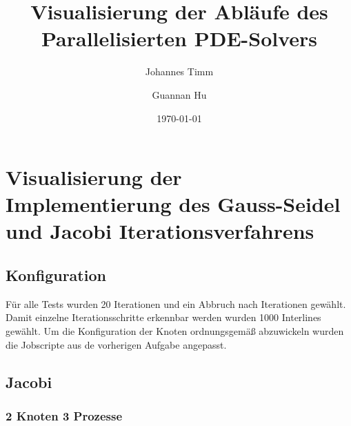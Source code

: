 \documentclass[a4paper,12pt]{scrartcl}
\title{Visualisierung der Abläufe des Parallelisierten PDE-Solvers}
\author{Johannes Timm \and Guannan Hu}
\date{\today}
\begin{document}
\maketitle
\notag

\section{Visualisierung der Implementierung des Gauss-Seidel und Jacobi Iterationsverfahrens}
\subsection{Konfiguration}
Für alle Tests wurden 20 Iterationen und ein Abbruch nach Iterationen gewählt. Damit einzelne Iterationsschritte erkennbar werden wurden 1000 Interlines gewählt. Um die Konfiguration der Knoten  ordnungsgemäß abzuwickeln wurden die Jobscripte aus de vorherigen Aufgabe angepasst.
\subsection{Jacobi}
\subsubsection{2 Knoten 3 Prozesse}
\end{document}
